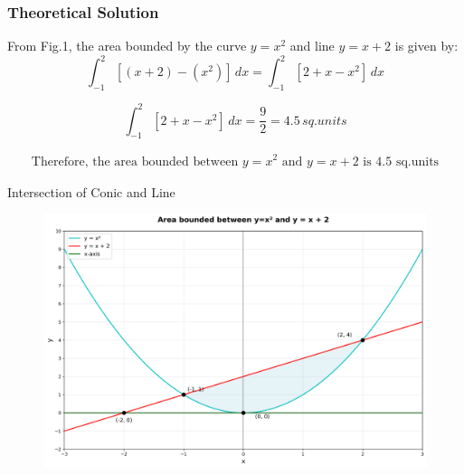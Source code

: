 \documentclass{beamer}
\begin{document}
\begin{frame}[fragile]
    \frametitle{Theoretical Solution}
From Fig.1, the area bounded by the curve $y = x^2$ and line $y = x + 2$ is given by:
\begin{equation}
    \int_{-1}^{2} [(x+2) - (x^2)] \,dx = \int_{-1}^{2} [2 + x -x^2] \,dx
\end{equation}

\begin{equation}
 \int_{-1}^{2} [2 + x -x^2] \,dx = \dfrac{9}{2} = 4.5 \, sq.units   
\end{equation}

\begin{align*}
\boxed{\text{Therefore, the area bounded between $y=x^2$ and $y=x+2$ is 4.5 sq.units}}
\end{align*}
\end{frame}



\begin{frame}{Intersection of Conic and Line}
\begin{figure}
   \centering
    \includegraphics[width=\columnwidth, height=0.8\textheight, keepaspectratio]{figs/fig1.png}
    \label{fig:Beamer/figs/fig1.png}
\end{figure}
\end{frame}
\end{document}
